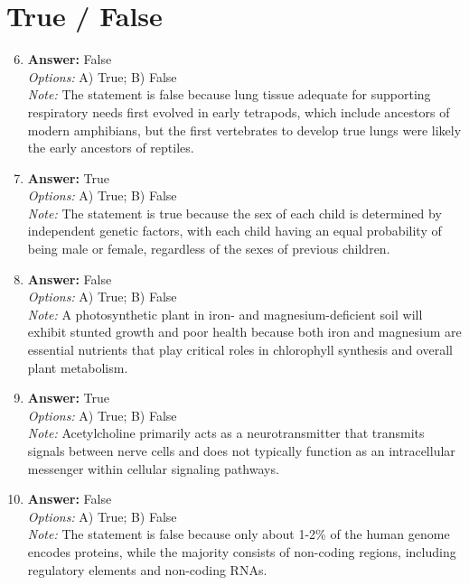 \documentclass[12pt]{article}
\begin{document}
\section*{True / False}
\begin{enumerate}[label=\arabic*.]
\setcounter{enumi}{5}
\item \textbf{Answer:} False
\\ \textit{Options:} A) True; B) False
\\ \textit{Note:} The statement is false because lung tissue adequate for supporting respiratory needs first evolved in early tetrapods, which include ancestors of modern amphibians, but the first vertebrates to develop true lungs were likely the early ancestors of reptiles.
\item \textbf{Answer:} True
\\ \textit{Options:} A) True; B) False
\\ \textit{Note:} The statement is true because the sex of each child is determined by independent genetic factors, with each child having an equal probability of being male or female, regardless of the sexes of previous children.
\item \textbf{Answer:} False
\\ \textit{Options:} A) True; B) False
\\ \textit{Note:} A photosynthetic plant in iron- and magnesium-deficient soil will exhibit stunted growth and poor health because both iron and magnesium are essential nutrients that play critical roles in chlorophyll synthesis and overall plant metabolism.
\item \textbf{Answer:} True
\\ \textit{Options:} A) True; B) False
\\ \textit{Note:} Acetylcholine primarily acts as a neurotransmitter that transmits signals between nerve cells and does not typically function as an intracellular messenger within cellular signaling pathways.
\item \textbf{Answer:} False
\\ \textit{Options:} A) True; B) False
\\ \textit{Note:} The statement is false because only about 1-2\% of the human genome encodes proteins, while the majority consists of non-coding regions, including regulatory elements and non-coding RNAs.
\end{enumerate}
\end{document}
